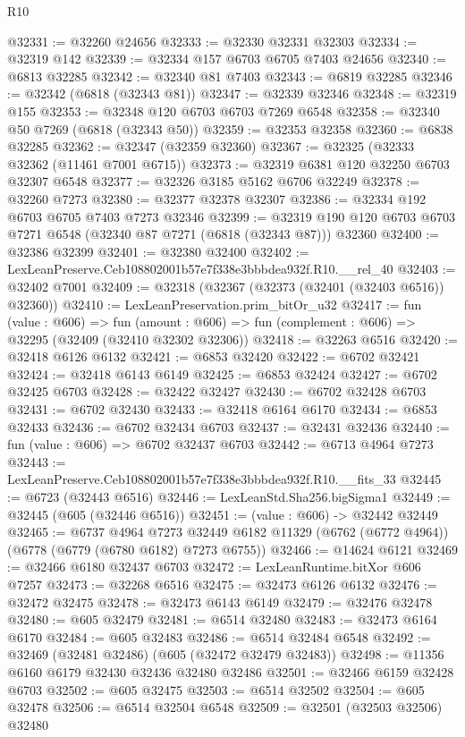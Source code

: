 \begin{lexlean}{R10}
\begin{coremodule}
@32331 := @32260 @24656
@32333 := @32330 @32331 @32303
@32334 := @32319 @142
@32339 := @32334 @157 @6703 @6705 @7403 @24656
@32340 := @6813 @32285
@32342 := @32340 @81 @7403
@32343 := @6819 @32285
@32346 := @32342 (@6818 (@32343 @81))
@32347 := @32339 @32346
@32348 := @32319 @155
@32353 := @32348 @120 @6703 @6703 @7269 @6548
@32358 := @32340 @50 @7269 (@6818 (@32343 @50))
@32359 := @32353 @32358
@32360 := @6838 @32285
@32362 := @32347 (@32359 @32360)
@32367 := @32325 (@32333 @32362 (@11461 @7001 @6715))
@32373 := @32319 @6381 @120 @32250 @6703 @32307 @6548
@32377 := @32326 @3185 @5162 @6706 @32249
@32378 := @32260 @7273
@32380 := @32377 @32378 @32307
@32386 := @32334 @192 @6703 @6705 @7403 @7273 @32346
@32399 := @32319 @190 @120 @6703 @6703 @7271 @6548 (@32340 @87 @7271 (@6818 (@32343 @87))) @32360
@32400 := @32386 @32399
@32401 := @32380 @32400
@32402 := LexLeanPreserve.Ceb108802001b57e7f338e3bbbdea932f.R10.__rel_40
@32403 := @32402 @7001
@32409 := @32318 (@32367 (@32373 (@32401 (@32403 @6516)) @32360))
@32410 := LexLeanPreservation.prim_bitOr_u32
@32417 := fun (value : @606) =>
  fun (amount : @606) => fun (complement : @606) => @32295 (@32409 (@32410 @32302 @32306))
@32418 := @32263 @6516
@32420 := @32418 @6126 @6132
@32421 := @6853 @32420
@32422 := @6702 @32421
@32424 := @32418 @6143 @6149
@32425 := @6853 @32424
@32427 := @6702 @32425 @6703
@32428 := @32422 @32427
@32430 := @6702 @32428 @6703
@32431 := @6702 @32430
@32433 := @32418 @6164 @6170
@32434 := @6853 @32433
@32436 := @6702 @32434 @6703
@32437 := @32431 @32436
@32440 := fun (value : @606) => @6702 @32437 @6703
@32442 := @6713 @4964 @7273
@32443 := LexLeanPreserve.Ceb108802001b57e7f338e3bbbdea932f.R10.__fits_33
@32445 := @6723 (@32443 @6516)
@32446 := LexLeanStd.Sha256.bigSigma1
@32449 := @32445 (@605 (@32446 @6516))
@32451 := (value : @606) -> @32442 @32449
@32465 := @6737
    @4964
    @7273
    @32449
    @6182
    @11329
    (@6762 (@6772 @4964))
    (@6778 (@6779 (@6780 @6182) @7273 @6755))
@32466 := @14624 @6121
@32469 := @32466 @6180 @32437 @6703
@32472 := LexLeanRuntime.bitXor @606 @7257
@32473 := @32268 @6516
@32475 := @32473 @6126 @6132
@32476 := @32472 @32475
@32478 := @32473 @6143 @6149
@32479 := @32476 @32478
@32480 := @605 @32479
@32481 := @6514 @32480
@32483 := @32473 @6164 @6170
@32484 := @605 @32483
@32486 := @6514 @32484 @6548
@32492 := @32469 (@32481 @32486) (@605 (@32472 @32479 @32483))
@32498 := @11356 @6160 @6179 @32430 @32436 @32480 @32486
@32501 := @32466 @6159 @32428 @6703
@32502 := @605 @32475
@32503 := @6514 @32502
@32504 := @605 @32478
@32506 := @6514 @32504 @6548
@32509 := @32501 (@32503 @32506) @32480

\end{coremodule}
\end{lexlean}
